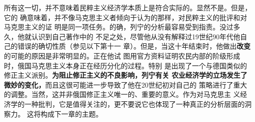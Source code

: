所有这一切，并不意味着民粹主义经济学本质上是符合实际的。显然不是。但是，它的
确意味着，并不像马克思主义者倾向于认为的那样，对民粹主义的批评和对马克思主义的证
明是同一项任务。的确，列宁的分析最容易受到指责。没过多久，他就认识到自己著作中的
不足之处，尽管他从没有解释过19世纪90年代他自己的错误的确切性质（参见以下第十一
章）。但是，当这十年结束时，他做出\textbf{改变}的可能的原因是非常明显的。正在他试
图用官方资料证明农民内部的阶级形成时，俄国马克思主义本身正在经历分化的过程。特别
是出现了一个与德国类似的修正主义派别。\textbf{为阻止修正主义的不良影响，列宁有关
  农业经济学的立场发生了微妙的变化，}而且这很可能进一步导致了他在20世纪初对自己的
策略进行了重大的调整。当然，这并非俄国修正主义唯一的、重要的意义。作为对马克思主
义经济学的一种批判，它是值得关注的，更不要说它也体现了一种真正的分析层面的洞察力。
这将构成下一章的主题。








